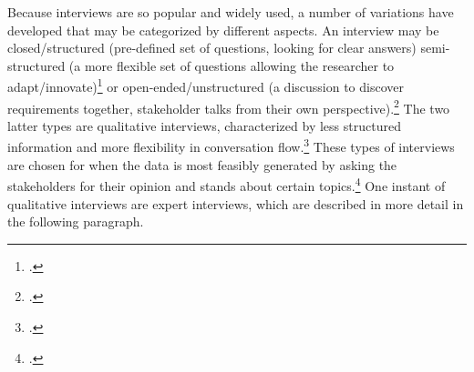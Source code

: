 Because interviews are so popular and widely used, a number of variations have developed that may be categorized by different aspects. An interview may be closed/structured (pre-defined set of questions, looking for clear answers) semi-structured (a more flexible set of questions allowing the researcher to adapt/innovate)\footcites[Cf.][p.39]{EdwardsWhatqualitativeinterviewing2013} or open-ended/unstructured (a discussion to discover requirements together, stakeholder talks from their own perspective).\footcites[Cf.][p.2]{TiwariMethodologySelectionRequirement2017}[cf.][p.40]{EdwardsWhatqualitativeinterviewing2013} The two latter types are qualitative interviews, characterized by less structured information and more flexibility in conversation flow.\footcite[Cf.][p.13]{EdwardsWhatqualitativeinterviewing2013} These types of interviews are chosen for when the data is most feasibly generated by asking the stakeholders for their opinion and stands about certain topics.\footcite[Cf.][p.76]{MasonQualitativeresearching2002} One instant of qualitative interviews are expert interviews, which are described in more detail in the following paragraph.


